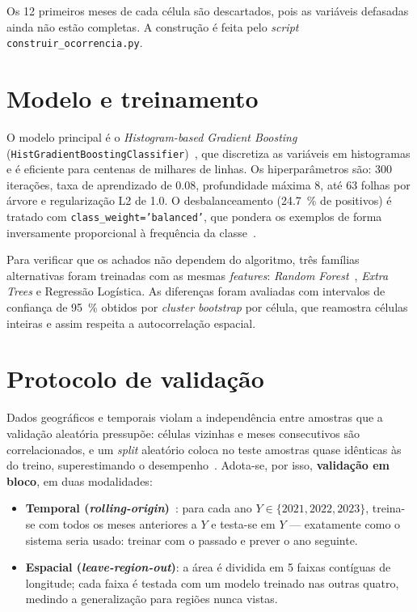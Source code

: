\documentclass[tcc2]{uftex}
\begin{document}
Os 12 primeiros meses de cada célula são descartados, pois as variáveis defasadas ainda não estão completas. A construção é feita pelo \emph{script} \texttt{construir\_ocorrencia.py}.

\section{Modelo e treinamento}
\label{sec:metod_modelo}

O modelo principal é o \emph{Histogram-based Gradient Boosting} (\texttt{HistGradientBoostingClassifier})~\cite{friedman2001greedy,ke2017lightgbm}, que discretiza as variáveis em histogramas e é eficiente para centenas de milhares de linhas. Os hiperparâmetros são: 300 iterações, taxa de aprendizado de \num{0,08}, profundidade máxima 8, até 63 folhas por árvore e regularização L2 de \num{1,0}. O desbalanceamento (\SI{24,7}{\percent} de positivos) é tratado com \texttt{class\_weight='balanced'}, que pondera os exemplos de forma inversamente proporcional à frequência da classe~\cite{he2009learning}.

Para verificar que os achados não dependem do algoritmo, três famílias alternativas foram treinadas com as mesmas \emph{features}: \emph{Random Forest}~\cite{breiman2001random}, \emph{Extra Trees} e Regressão Logística. As diferenças foram avaliadas com intervalos de confiança de \SI{95}{\percent} obtidos por \emph{cluster bootstrap} por célula, que reamostra células inteiras e assim respeita a autocorrelação espacial.

\section{Protocolo de validação}
\label{sec:metod_validacao}

Dados geográficos e temporais violam a independência entre amostras que a validação aleatória pressupõe: células vizinhas e meses consecutivos são correlacionados, e um \emph{split} aleatório coloca no teste amostras quase idênticas às do treino, superestimando o desempenho~\cite{roberts2017cv}. Adota-se, por isso, \textbf{validação em bloco}, em duas modalidades:

\begin{itemize}
  \item \textbf{Temporal (\emph{rolling-origin})}~\cite{bergmeir2012cv}: para cada ano \(Y \in \{2021, 2022, 2023\}\), treina-se com todos os meses anteriores a \(Y\) e testa-se em \(Y\) --- exatamente como o sistema seria usado: treinar com o passado e prever o ano seguinte.
  \item \textbf{Espacial (\emph{leave-region-out})}: a área é dividida em 5 faixas contíguas de longitude; cada faixa é testada com um modelo treinado nas outras quatro, medindo a generalização para regiões nunca vistas.
\end{itemize}
\end{document}
